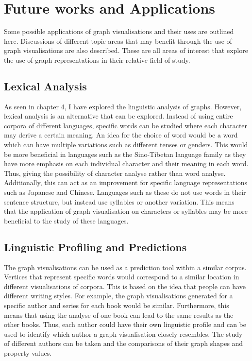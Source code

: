 \section{Future works and Applications}
Some possible applications of graph visualisations and their uses are outlined here. Discussions of different topic areas that may benefit through the use of graph visualisations are also described. These are all areas of interest that explore the use of graph representations in their relative field of study.

\subsection{Lexical Analysis}
As seen in chapter 4, I have explored the linguistic analysis of graphs. However, lexical analysis is an alternative that can be explored. Instead of using entire corpora of different languages, specific words can be studied where each character may derive a certain meaning. An idea for the choice of word would be a word which can have multiple variations such as different tenses or genders. This would be more beneficial in languages such as the Sino-Tibetan language family as they have more emphasis on each individual character and their meaning in each word. Thus, giving the possibility of character analyse rather than word analyse. Additionally, this can act as an improvement for specific language representations such as Japanese and Chinese. Languages such as these do not use words in their sentence structure, but instead use syllables \cite{peng2006temporal} or another variation. This means that the application of graph visualisation on characters or syllables may be more beneficial to the study of these languages.

\subsection{Linguistic Profiling and Predictions}
The graph visualisations can be used as a prediction tool within a similar corpus. Vertices that represent specific words would correspond to a similar location in different visualisations of corpora. This is based on the idea that people can have different writing styles. For example, the graph visualisations generated for a specific author and series for each book would be similar. Furthermore, this means that using the analyse of one book can lead to the same results as the other books. Thus, each author could have their own linguistic profile and can be used to identify which author a graph visualisation closely resembles. The study of different authors can be taken and the comparisons of their graph shapes and property values.

